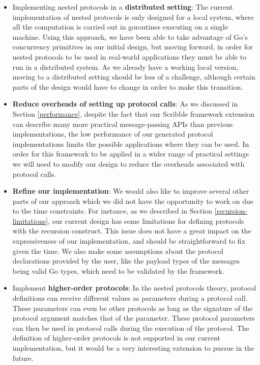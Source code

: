 \documentclass[12pt,twoside]{report}
\begin{document}
\begin{itemize}
    \item Implementing nested protocols in a \textbf{distributed setting}:
    The current implementation of nested protocols is only designed for a local system, where all the computation is carried out in goroutines executing on a single machine. Using this approach, we have been able to take advantage of Go's concurrency primitives in our initial design, but moving forward, in order for nested protocols to be used in real-world applications they must be able to run in a distributed system. As we already have a working local version, moving to a distributed setting should be less of a challenge, although certain parts of the design would have to change in order to make this transition.
    \item \textbf{Reduce overheads of setting up protocol calls}: As we discussed in Section \ref{performance}, despite the fact that our Scribble framework extension can describe many more practical message-passing APIs than previous implementations, the low performance of our generated protocol implementations limits the possible applications where they can be used. In order for this framework to be applied in a wider range of practical settings we will need to modify our design to reduce the overheads associated with protocol calls.
    \item \textbf{Refine our implementation}: We would also like to improve several other parts of our approach which we did not have the opportunity to work on due to the time constraints. For instance, as we described in Section \ref{recursion-limitations}, our current design has some limitations for defining protocols with the recursion construct. This issue does not have a great impact on the expressiveness of our implementation, and should be straightforward to fix given the time. We also make some assumptions about the protocol declarations provided by the user, like the payload types of the messages being valid Go types, which need to be validated by the framework.
    \item Implement \textbf{higher-order protocols}: In the nested protocols theory\cite{nestedprotocols}, protocol definitions can receive different values as parameters during a protocol call. These parameters can even be other protocols as long as the signature of the protocol argument matches that of the parameter. These protocol parameters can then be used in protocol calls during the execution of the protocol. The definition of higher-order protocols is not supported in our current implementation, but it would be a very interesting extension to pursue in the future.
\end{itemize}
\end{document}
